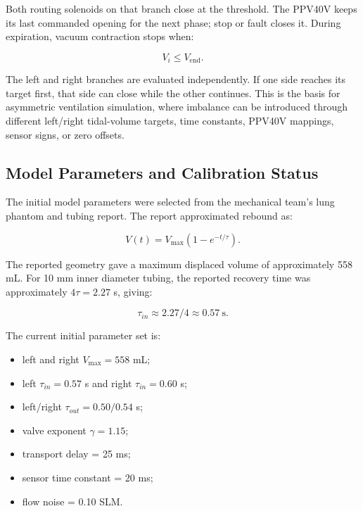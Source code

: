 \documentclass[11pt,a4paper]{article}
\begin{document}
Both routing solenoids on that branch close at the threshold. The PPV40V keeps
its last commanded opening for the next phase; stop or fault closes it.
During expiration, vacuum contraction stops when:

\begin{equation}
  V_i \leq V_{\mathrm{end}}.
\end{equation}

The left and right branches are evaluated independently. If one side reaches its target first, that side can close while the other continues. This is the basis for asymmetric ventilation simulation, where imbalance can be introduced through different left/right tidal-volume targets, time constants, PPV40V mappings, sensor signs, or zero offsets.

\subsection{Model Parameters and Calibration Status}

The initial model parameters were selected from the mechanical team's lung phantom and tubing report. The report approximated rebound as:

\begin{equation}
  V(t)=V_{\max}(1-e^{-t/\tau}).
\end{equation}

The reported geometry gave a maximum displaced volume of approximately 558 mL. For 10 mm inner diameter tubing, the reported recovery time was approximately $4\tau=2.27$ s, giving:

\begin{equation}
  \tau_{in}\approx 2.27/4 \approx 0.57~\mathrm{s}.
\end{equation}

The current initial parameter set is:

\begin{itemize}
  \item left and right $V_{\max}=558$ mL;
  \item left $\tau_{in}=0.57$ s and right $\tau_{in}=0.60$ s;
  \item left/right $\tau_{out}=0.50/0.54$ s;
  \item valve exponent $\gamma=1.15$;
  \item transport delay = 25 ms;
  \item sensor time constant = 20 ms;
  \item flow noise = 0.10 SLM.
\end{itemize}
\end{document}
